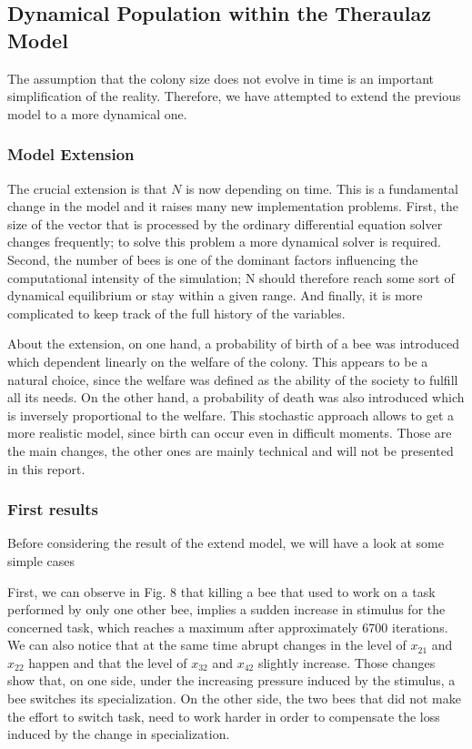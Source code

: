\subsection{Dynamical Population within the Theraulaz Model}

The assumption that the colony size does not evolve in time is an
important simplification of the reality. Therefore, we have attempted
to extend the previous model to a more dynamical one.


\subsubsection{Model Extension}

The crucial extension is that $N$ is now depending on time. This
is a fundamental change in the model and it raises many new implementation
problems. First, the size of the vector that is processed by the ordinary
differential equation solver changes frequently; to solve this problem
a more dynamical solver is required. Second, the number of bees is
one of the dominant factors influencing the computational intensity
of the simulation; N should therefore reach some sort of dynamical
equilibrium or stay within a given range. And finally, it is more complicated
to keep track of the full history of the variables.

About the extension, on one hand, a probability of birth of a
bee was introduced which dependent linearly on the welfare of the
colony. This appears to be a natural choice, since the welfare was
defined as the ability of the society to fulfill all its needs. On
the other hand, a probability of death was also introduced which is
inversely proportional to the welfare. This stochastic
approach allows to get a more realistic model, since birth can occur
even in difficult moments. Those are the main changes, the other ones
are mainly technical and will not be presented in this report.

\subsubsection{First results}

Before considering the result of the extend model, we will have a look
at some simple cases

First, we can observe in Fig. 8 that killing a bee that used
to work on a task performed by only one other bee, implies a sudden increase in stimulus for the concerned task, which reaches a maximum after approximately 6700 iterations. We can also notice that at the same time abrupt changes in the level of $x_{21}$ and $x_{22}$ happen and that the level of $x_{32}$ and $x_{42}$ slightly increase. Those changes show that, on one side, under the increasing pressure induced by the stimulus, a bee switches its specialization. On the other side, the two bees that did not make the effort to switch task, need to work harder in order to compensate the loss induced by the change in specialization.

